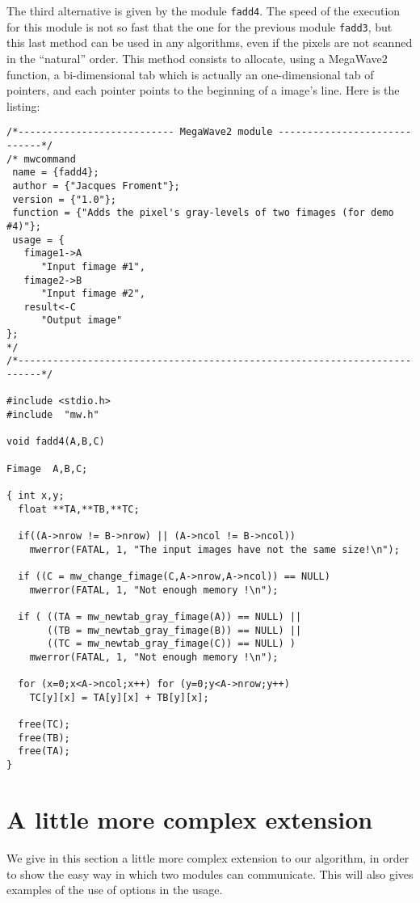 The third alternative is given by the module \verb+fadd4+.
The speed of the execution for this module is not so fast that the
one for the previous module \verb+fadd3+, but this last method can
be used in any algorithms, even if the pixels are not scanned
in the ``natural'' order.
This method consists to allocate, using a MegaWave2 function, a
bi-dimensional tab which is actually an one-dimensional tab of 
pointers, and each pointer points to the beginning of a image's
line. 
Here is the listing:
{\small
\label{listing_fadd4}
\begin{verbatim}
/*--------------------------- MegaWave2 module -----------------------------*/
/* mwcommand
 name = {fadd4};
 author = {"Jacques Froment"};
 version = {"1.0"};
 function = {"Adds the pixel's gray-levels of two fimages (for demo #4)"};
 usage = {
   fimage1->A 
      "Input fimage #1", 
   fimage2->B
      "Input fimage #2", 
   result<-C
      "Output image"
};
*/
/*--------------------------------------------------------------------------*/

#include <stdio.h>
#include  "mw.h"

void fadd4(A,B,C)

Fimage  A,B,C;

{ int x,y;
  float **TA,**TB,**TC;

  if((A->nrow != B->nrow) || (A->ncol != B->ncol))
    mwerror(FATAL, 1, "The input images have not the same size!\n");

  if ((C = mw_change_fimage(C,A->nrow,A->ncol)) == NULL)
    mwerror(FATAL, 1, "Not enough memory !\n");  

  if ( ((TA = mw_newtab_gray_fimage(A)) == NULL) ||
       ((TB = mw_newtab_gray_fimage(B)) == NULL) ||
       ((TC = mw_newtab_gray_fimage(C)) == NULL) )
    mwerror(FATAL, 1, "Not enough memory !\n");  

  for (x=0;x<A->ncol;x++) for (y=0;y<A->nrow;y++)
    TC[y][x] = TA[y][x] + TB[y][x];

  free(TC);
  free(TB);
  free(TA); 
}
\end{verbatim}
}

\section{A little more complex extension}
\label{start_ext}


We give in this section a little more complex extension to our algorithm,
in order to show the easy way in which two modules can communicate.
This will also gives examples of the use of options in the usage.

